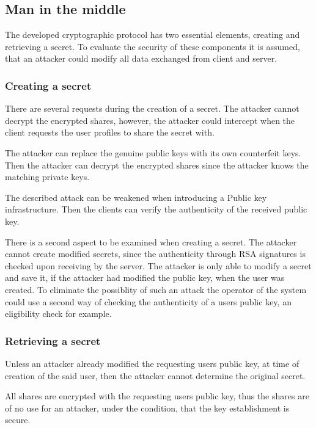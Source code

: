 \subsection{Man in the middle}

The developed cryptographic protocol has two essential elements, creating and
retrieving a secret. To evaluate the security of these components it is
assumed, that an attacker could modify all data exchanged from client and
server.

\subsubsection{Creating a secret}

There are several requests during the creation of a secret. The attacker cannot
decrypt the encrypted shares, however, the attacker could intercept when the
client requests the user profiles to share the secret with.

The attacker can replace the genuine public keys with its own counterfeit keys.
Then the attacker can decrypt the encrypted shares since the attacker knows the
matching private keys.

The described attack can be weakened when introducing a Public key
infrastructure. Then the clients can verify the authenticity of the received
public key.

There is a second aspect to be examined when creating a secret. The attacker
cannot create modified secrets, since the authenticity through RSA signatures
is checked upon receiving by the server. The attacker is only able to modify a
secret and save it, if the attacker had modified the public key, when the user
was created. To eliminate the possiblity of such an attack the operator of the
system could use a second way of checking the authenticity of a users public
key, an eligibility check for example.

\subsubsection{Retrieving a secret}

Unless an attacker already modified the requesting users public key, at time of
creation of the said user, then the attacker cannot determine the original
secret.

All shares are encrypted with the requesting users public key, thus the shares
are of no use for an attacker, under the condition, that the key establishment
is secure.

